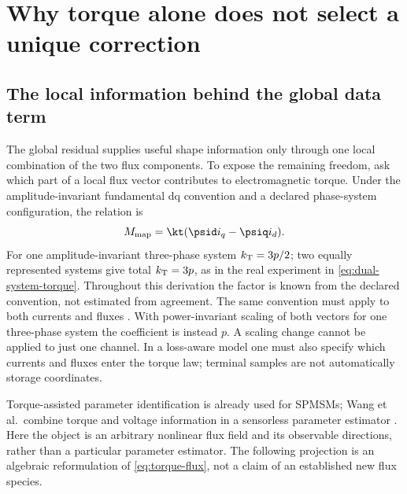 \section{Why torque alone does not select a unique correction}
\label{sec:torque-observability}
\subsection{The local information behind the global data term}
The global residual supplies useful shape information only through one local
combination of the two flux components. To expose the remaining freedom, ask
which part of a local flux vector contributes to electromagnetic torque. Under the amplitude-invariant
fundamental dq convention and a declared phase-system configuration, the relation is
\begin{equation}
 M_{\rm map}=\kt(\psid i_q-\psiq i_d).
 \label{eq:torque-flux}
\end{equation}
For one amplitude-invariant three-phase system $k_{\rm T}=3p/2$; two equally
represented systems give total $k_{\rm T}=3p$, as in the real experiment in
\cref{eq:dual-system-torque}. Throughout this derivation the factor is known
from the declared convention, not estimated from agreement. The same
convention must apply to both currents and fluxes
\cite{binder2017,schroeder2021,jebai2014}. With power-invariant scaling of
both vectors for one three-phase system the coefficient is instead $p$. A scaling change cannot be
applied to just one channel. In a loss-aware model one must also specify
which currents and fluxes enter the torque law; terminal samples are not
automatically storage coordinates.

Torque-assisted parameter identification is already used for SPMSMs;
Wang et al.\ combine torque and voltage information in a sensorless
parameter estimator \cite{wang2026torque}. Here the object is an arbitrary
nonlinear flux field and its observable directions, rather than a particular
parameter estimator. The following projection is an algebraic reformulation
of \cref{eq:torque-flux}, not a claim of an established new flux species.

